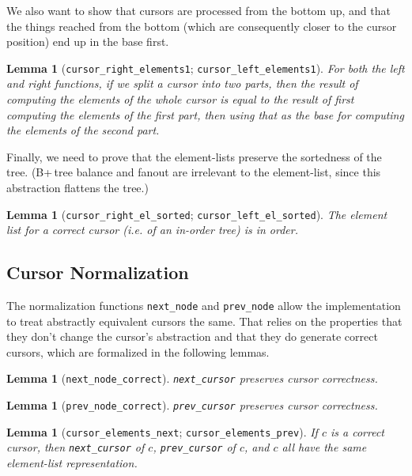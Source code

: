 \documentclass[12pt]{article}
\newtheorem{lemma}[theorem]{Lemma}
\begin{document}
We also want to show that cursors are processed from the bottom up, and that the things reached from the bottom (which are consequently closer to the cursor position) end up in the base first.

\begin{lemma}[\texttt{cursor\_right\_elements1}; \texttt{cursor\_left\_elements1}]
For both the left and right functions, if we split a cursor into two parts, then the result of computing the elements of the whole cursor is equal to the result of first computing the elements of the first part, then using that as the base for computing the elements of the second part.
\end{lemma}

Finally, we need to prove that the element-lists preserve the sortedness of the tree. (B+\,tree balance and fanout are irrelevant to the element-list, since this abstraction flattens the tree.)

\begin{lemma}[\texttt{cursor\_right\_el\_sorted}; \texttt{cursor\_left\_el\_sorted}]
The element list for a correct cursor (i.e. of an in-order tree) is in order.
\end{lemma}

\subsection{Cursor Normalization}
\label{subsec:norm}

The normalization functions \texttt{next\_node} and \texttt{prev\_node} allow the implementation to treat abstractly equivalent cursors the same. That relies on the properties that they don’t change the cursor’s abstraction and that they do generate correct cursors, which are formalized in the following lemmas.

\begin{lemma}[\texttt{next\_node\_correct}]
\texttt{next\_cursor} preserves cursor correctness.
\end{lemma}

\begin{lemma}[\texttt{prev\_node\_correct}]
\texttt{prev\_cursor} preserves cursor correctness.
\end{lemma}

\begin{lemma}[\texttt{cursor\_elements\_next}; \texttt{cursor\_elements\_prev}]
If $c$ is a correct cursor, then \texttt{next\_cursor} of $c$, \texttt{prev\_cursor} of $c$, and $c$ all have the same element-list representation.
\end{lemma}
\end{document}
